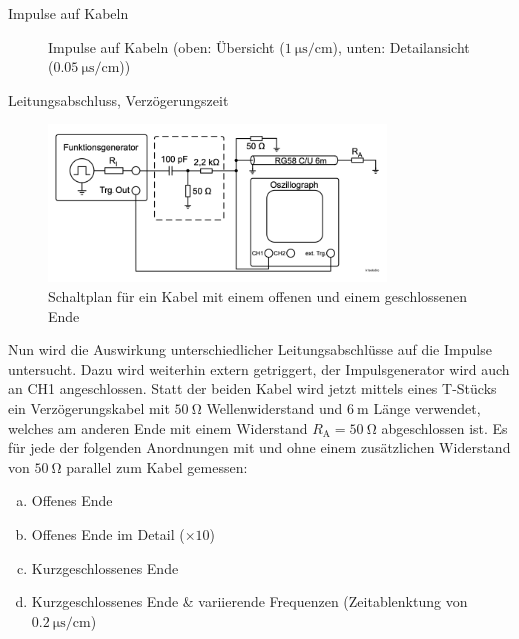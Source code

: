 \documentclass[ngerman]{scrartcl}
\theoremstyle{definition}
\begin{document}
\begin{aufgabe}{Impulse auf Kabeln}
\begin{figure}[H]
				\caption{Impulse auf Kabeln (oben: Übersicht ($\SI{1}{\micro\second\per\centi\meter}$), unten: Detailansicht ($\SI{0.05}{\micro\second\per\centi\meter}$))}
				\label{fig:DS0004,5}
			\end{figure}
		\auswertung

			
		\end{aufgabe}
\clearpage

		\begin{aufgabe}{Leitungsabschluss, Verzögerungszeit}
			\aufbau
			\begin{figure}[H]
				\centering
				\includegraphics[width=0.8\textwidth]{figs/Aufbau_1_3_Leitungsabschluss.png}
				\caption{Schaltplan für ein Kabel mit einem offenen und einem geschlossenen Ende~\cite{anleitung}}
				\label{fig:aufbau_1_3_leitungsabschluss}
			\end{figure}
			Nun wird die Auswirkung unterschiedlicher Leitungsabschlüsse auf die Impulse untersucht. Dazu wird weiterhin extern getriggert, der Impulsgenerator wird auch an CH1 angeschlossen. Statt der beiden Kabel wird jetzt mittels eines T-Stücks ein Verzögerungskabel mit $\SI{50}{\ohm}$ Wellenwiderstand und $\SI{6}{\meter}$ Länge verwendet, welches am anderen Ende mit einem Widerstand $R_\mathrm{A} = \SI{50}{\ohm}$ abgeschlossen ist. Es für jede der folgenden Anordnungen mit und ohne einem zusätzlichen Widerstand von $\SI{50}{\ohm}$ parallel zum Kabel gemessen:
			\begin{enumerate}[(a)]
				\item Offenes Ende
				\item Offenes Ende im Detail ($\times 10$)
				\item Kurzgeschlossenes Ende
				\item Kurzgeschlossenes Ende \& variierende Frequenzen (Zeitablenktung von $\SI{0.2}{\micro\second\per\centi\meter}$)
			\end{enumerate}
			\MesswUndAusw
			\begin{unteraufgabe}
				\begin{figure}[H]

\end{figure}
\end{unteraufgabe}
\end{aufgabe}
\end{document}
